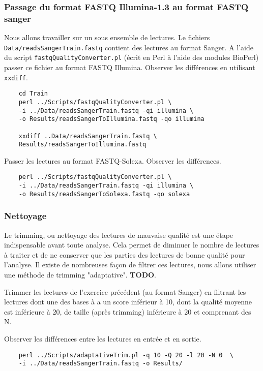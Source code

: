 \documentclass[a4paper,12pt]{article}
\begin{document}
\subsubsection{Passage du format FASTQ Illumina-1.3 au format FASTQ sanger}
Nous allons travailler sur un sous ensemble de lectures. Le fichiers \verb=Data/readsSangerTrain.fastq= contient des lectures au format Sanger. A l'aide du script \verb=fastqQualityConverter.pl= (écrit en Perl à l'aide des modules BioPerl) passer ce fichier au format FASTQ Illumina. Observer les différences
en utilisant \verb=xxdiff=.
\begin{lstlisting}
	cd Train
	perl ../Scripts/fastqQualityConverter.pl \
	-i ../Data/readsSangerTrain.fastq -qi illumina \
	-o Results/readsSangerToIllumina.fastq -qo illumina
	
	xxdiff ..Data/readsSangerTrain.fastq \
	Results/readsSangerToIllumina.fastq
\end{lstlisting}


Passer les lectures au format FASTQ-Solexa. Observer les différences.

\begin{lstlisting}
	perl ../Scripts/fastqQualityConverter.pl \
	-i ../Data/readsSangerTrain.fastq -qi illumina \
	-o Results/readsSangerToSolexa.fastq -qo solexa
	\end{lstlisting}
	
	
\subsubsection{Nettoyage}
Le trimming, ou nettoyage des lectures de mauvaise qualité est une étape indispensable avant toute analyse. Cela permet de diminuer le nombre de lectures à traiter et de ne conserver que les parties des lectures de bonne qualité pour l'analyse. Il existe de nombreuses façon de filtrer ces lectures, nous allons utiliser une méthode de  trimming "adaptative". \textbf{TODO}.

Trimmer les lectures de l'exercice précédent (au format Sanger) en filtrant les lectures dont une des bases à a un score inférieur à 10, dont la qualité moyenne est inférieure à 20, de taille (après trimming) inférieure à 20 et comprenant des N. 

Observer les différences entre les lectures en entrée et en sortie.

\begin{lstlisting}	
	perl ../Scripts/adaptativeTrim.pl -q 10 -Q 20 -l 20 -N 0  \
	-i ../Data/readsSangerTrain.fastq -o Results/
\end{lstlisting}
\end{document}
